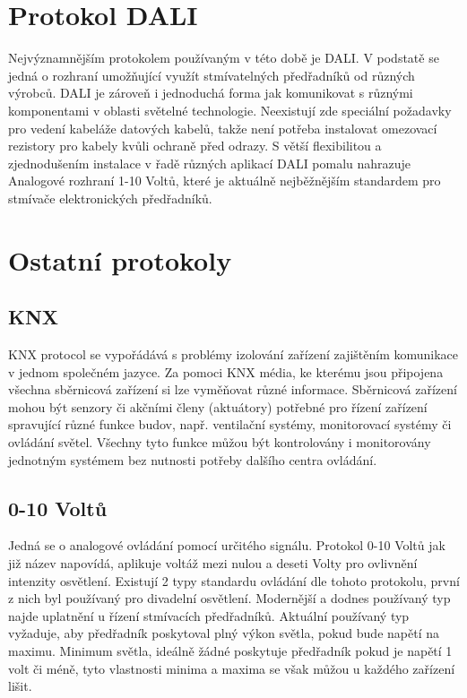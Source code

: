 \documentclass[FM,RP]{tulthesis}
\begin{document}
 \section {Protokol DALI}
  Nejvýznamnějším protokolem používaným v této době je DALI. V podstatě se jedná o rozhraní umožňující využít stmívatelných předřadníků od různých výrobců. DALI je zároveň i jednoduchá forma jak komunikovat s různými komponentami v oblasti světelné technologie. Neexistují zde speciální požadavky pro vedení kabeláže datových kabelů, takže není potřeba instalovat omezovací rezistory pro kabely kvůli ochraně před odrazy. S větší flexibilitou a zjednodušením instalace v řadě různých aplikací DALI pomalu nahrazuje Analogové rozhraní 1-10 Voltů, které je aktuálně nejběžnějším standardem pro stmívače elektronických předřadníků.
\cite{DALI-manual}
 
 \section {Ostatní protokoly}
  
  \subsection{KNX}
  KNX protocol se vypořádává s problémy izolování zařízení zajištěním komunikace v jednom společném jazyce. Za pomoci KNX média, ke kterému jsou připojena všechna sběrnicová zařízení si lze vyměňovat různé informace. Sběrnicová zařízení mohou být senzory či akčními členy (aktuátory) potřebné pro řízení zařízení spravující různé funkce budov, např. ventilační systémy, monitorovací systémy či ovládání světel. Všechny tyto funkce můžou být kontrolovány i monitorovány jednotným systémem bez nutnosti potřeby dalšího centra ovládání. \cite{knx-introduction}
  \subsection{0-10 Voltů}
  Jedná se o analogové ovládání pomocí určitého signálu. Protokol 0-10 Voltů jak již název napovídá, aplikuje voltáž mezi nulou a deseti Volty pro ovlivnění intenzity osvětlení. Existují 2 typy standardu ovládání dle tohoto protokolu, první z nich byl používaný pro divadelní osvětlení. Modernější a dodnes používaný typ najde uplatnění u řízení stmívacích předřadníků. Aktuální používaný typ vyžaduje, aby předřadník poskytoval plný výkon světla, pokud bude napětí na maximu.
  Minimum světla, ideálně žádné poskytuje předřadník pokud je napětí 1 volt či méně, tyto vlastnosti minima a maxima se však můžou u každého zařízení lišit. 
  \cite{0-10Volts}
 \newpage
\end{document}
